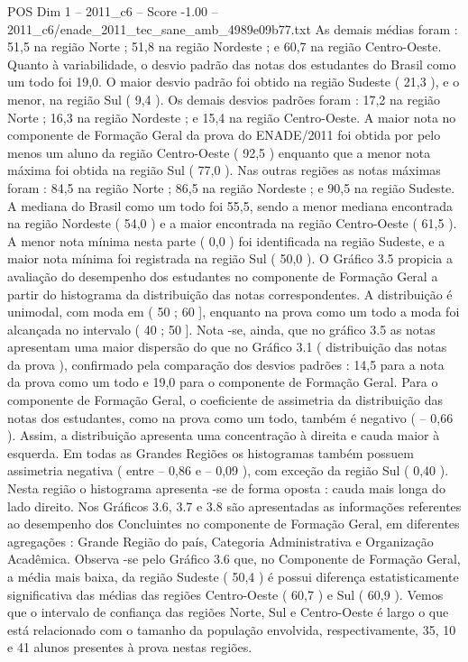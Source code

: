 \begin{textsample}{POS Dim 1 – 2011\_c6 – Score -1.00 – 2011\_c6/enade\_2011\_tec\_sane\_amb\_4989e09b77.txt}
As demais médias foram : 51,5 na região Norte ; 51,8 na região Nordeste ; e 60,7 na região Centro-Oeste.
Quanto à variabilidade, o desvio padrão das notas dos estudantes do Brasil como um todo foi 19,0.
O maior desvio padrão foi obtido na região Sudeste ( 21,3 ), e o menor, na região Sul ( 9,4 ).
Os demais desvios padrões foram : 17,2 na região Norte ; 16,3 na região Nordeste ; e 15,4 na região Centro-Oeste.
A maior nota no componente de Formação Geral da prova do ENADE/2011 foi obtida por pelo menos um aluno da região Centro-Oeste ( 92,5 ) enquanto que a menor nota máxima foi obtida na região Sul ( 77,0 ).
Nas outras regiões as notas máximas foram : 84,5 na região Norte ; 86,5 na região Nordeste ; e 90,5 na região Sudeste.
A mediana do Brasil como um todo foi 55,5, sendo a menor mediana encontrada na região Nordeste ( 54,0 ) e a maior encontrada na região Centro-Oeste ( 61,5 ).
A menor nota mínima nesta parte ( 0,0 ) foi identificada na região Sudeste, e a maior nota mínima foi registrada na região Sul ( 50,0 ).
O Gráfico 3.5 propicia a avaliação do desempenho dos estudantes no componente de Formação Geral a partir do histograma da distribuição das notas correspondentes.
A distribuição é unimodal, com moda em ( 50 ; 60 ], enquanto na prova como um todo a moda foi alcançada no intervalo ( 40 ; 50 ].
Nota -se, ainda, que no gráfico 3.5 as notas apresentam uma maior dispersão do que no Gráfico 3.1 ( distribuição das notas da prova ), confirmado pela comparação dos desvios padrões : 14,5 para a nota da prova como um todo e 19,0 para o componente de Formação Geral.
Para o componente de Formação Geral, o coeficiente de assimetria da distribuição das notas dos estudantes, como na prova como um todo, também é negativo ( – 0,66 ).
Assim, a distribuição apresenta uma concentração à direita e cauda maior à esquerda.
Em todas as Grandes Regiões os histogramas também possuem assimetria negativa ( entre – 0,86 e – 0,09 ), com exceção da região Sul ( 0,40 ).
Nesta região o histograma apresenta -se de forma oposta : cauda mais longa do lado direito.
Nos Gráficos 3.6, 3.7 e 3.8 são apresentadas as informações referentes ao desempenho dos Concluintes no componente de Formação Geral, em diferentes agregações : Grande Região do país, Categoria Administrativa e Organização Acadêmica.
Observa -se pelo Gráfico 3.6 que, no Componente de Formação Geral, a média mais baixa, da região Sudeste ( 50,4 ) é possui diferença estatisticamente significativa das médias das regiões Centro-Oeste ( 60,7 ) e Sul ( 60,9 ).
Vemos que o intervalo de confiança das regiões Norte, Sul e Centro-Oeste é largo o que está relacionado com o tamanho da população envolvida, respectivamente, 35, 10 e 41 alunos presentes à prova nestas regiões.

\end{textsample}
